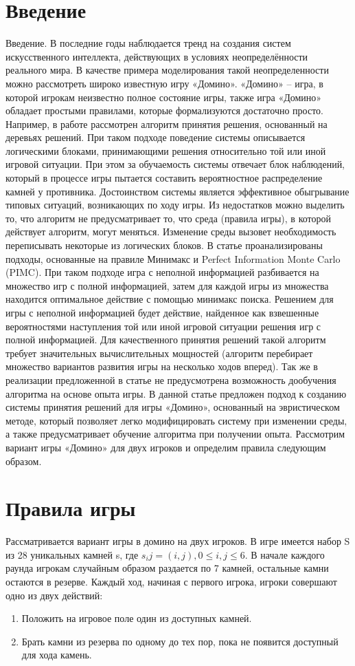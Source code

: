 \documentclass[11pt]{article}
\begin{document}
\section{Введение}
Введение. В последние годы наблюдается тренд на создания систем искусственного интеллекта, действующих в условиях неопределённости реального мира. В качестве примера моделирования такой неопределенности можно рассмотреть широко известную игру «Домино». «Домино» – игра, в которой игрокам неизвестно полное состояние игры, также игра «Домино» обладает простыми правилами, которые формализуются достаточно просто. Например, в работе \cite{bib2} рассмотрен алгоритм принятия решения, основанный на деревьях решений. При таком подходе поведение системы описывается логическими блоками, принимающими решения относительно той или иной игровой ситуации. При этом за обучаемость системы отвечает блок наблюдений, который в процессе игры пытается составить вероятностное распределение камней у противника. Достоинством системы является эффективное обыгрывание типовых ситуаций, возникающих по ходу игры. Из недостатков можно выделить то, что алгоритм не предусматривает то, что среда (правила игры), в которой действует алгоритм, могут меняться. Изменение среды вызовет необходимость переписывать некоторые из логических блоков. В статье \cite{bib3} проанализированы подходы, основанные на правиле Минимакс и Perfect Information Monte Carlo (PIMC). 
{\newpage}
При таком подходе игра с неполной информацией разбивается на множество игр с полной информацией, затем для каждой игры из множества находится оптимальное действие с помощью минимакс поиска. Решением для игры с неполной информацией будет действие, найденное как взвешенные вероятностями наступления той или иной игровой ситуации решения игр с полной информацией. Для качественного принятия решений такой алгоритм требует значительных вычислительных мощностей (алгоритм перебирает множество вариантов развития игры на несколько ходов вперед). Так же в реализации предложенной в статье не предусмотрена возможность дообучения алгоритма на основе опыта игры. В данной статье предложен подход к созданию системы принятия решений для игры «Домино», основанный на эвристическом методе, который позволяет легко модифицировать систему при изменении среды, а также предусматривает обучение алгоритма при получении опыта.
    Рассмотрим вариант игры «Домино» для двух игроков и определим правила следующим образом. 

\section{Правила игры}
Рассматривается вариант игры в домино на двух игроков. В игре имеется набор S из 28 уникальных камней s, где $s_ij=(i,j), 0\leqslant i,j \leqslant6$.
В начале каждого раунда игрокам случайным образом раздается по 7 камней, остальные камни остаются в резерве. Каждый ход, начиная с первого игрока, игроки совершают одно из двух действий:
\begin{enumerate}
    \item Положить на игровое поле один из доступных камней.
    \item Брать камни из резерва по одному до тех пор, пока не появится доступный для хода камень. 
\end{enumerate}
\end{document}
